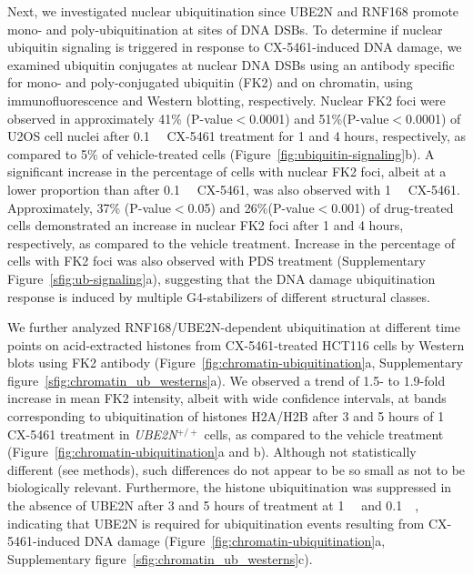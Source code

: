 Next, we investigated nuclear ubiquitination since UBE2N and RNF168 promote mono- and poly-ubiquitination at sites of DNA DSBs. 
To determine if nuclear ubiquitin signaling is triggered in response to CX-5461-induced DNA damage, we examined ubiquitin conjugates at nuclear DNA DSBs using an antibody specific for mono- and poly-conjugated ubiquitin (FK2) and on chromatin, using immunofluorescence and Western blotting, respectively.
Nuclear FK2 foci were observed in approximately 41\% (P-value$<$0.0001) and 51\%(P-value$<$0.0001) of U2OS cell nuclei after \SI{0.1}{\micro\Molar} CX-5461 treatment for 1 and 4 hours, respectively, as compared to 5\% of vehicle-treated cells (Figure~\ref{fig:ubiquitin-signaling}b). 
A significant increase in the percentage of cells with nuclear FK2 foci, albeit at a lower proportion than after \SI{0.1}{\micro\Molar} CX-5461, was also observed with \SI{1}{\micro\Molar} CX-5461. Approximately, 37\% (P-value$<$0.05) and 26\%(P-value$<$0.001) of drug-treated cells demonstrated an increase in nuclear FK2 foci after 1 and 4 hours, respectively, as compared to the vehicle treatment. Increase in the percentage of cells with FK2 foci was also observed with PDS treatment (Supplementary Figure~\ref{sfig:ub-signaling}a), suggesting that the DNA damage ubiquitination response is induced by multiple G4-stabilizers of different structural classes.

We further analyzed RNF168/UBE2N-dependent ubiquitination at different time points on acid-extracted histones from CX-5461-treated HCT116 cells by Western blots using FK2 antibody (Figure~\ref{fig:chromatin-ubiquitination}a, Supplementary figure~\ref{sfig:chromatin_ub_westerns}a). 
We observed a trend of 1.5- to 1.9-fold increase in mean FK2 intensity, albeit with wide confidence intervals, at bands corresponding to ubiquitination of histones H2A/H2B after 3 and 5 hours of \SI{1}{\micro\Molar} CX-5461 treatment in \textit{UBE2N$^{+/+}$} cells, as compared to the vehicle treatment (Figure~\ref{fig:chromatin-ubiquitination}a and b). Although not statistically different (see methods), such differences do not appear to be so small as not to be biologically relevant. 
Furthermore, the histone ubiquitination was suppressed in the absence of UBE2N after 3 and 5 hours of treatment at \SI{1}{\micro\Molar} and \SI{0.1}{\micro\Molar}, indicating that UBE2N is required for ubiquitination events resulting from CX-5461-induced DNA damage (Figure~\ref{fig:chromatin-ubiquitination}a, Supplementary figure~\ref{sfig:chromatin_ub_westerns}c).


